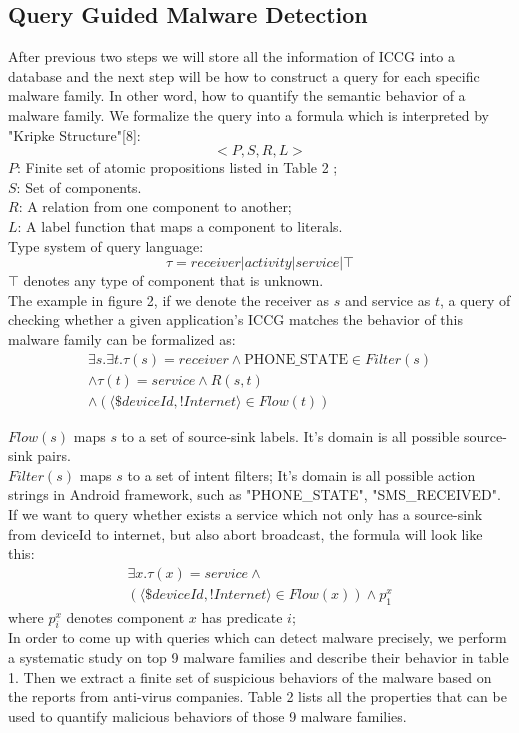 \documentclass{sig-alternate}
\begin{document}
\subsection{Query Guided Malware Detection}
After previous two steps we will store all the information of ICCG into a database and the next step will be how to construct a query for each specific malware family. In other word, how to quantify the semantic behavior of a malware family.
We formalize the query into a formula which is interpreted by "Kripke Structure"[8]:
\[
<P, S, R, L> 
\]
$P$: Finite set of atomic propositions listed in Table 2 ; \\
$S$: Set of components.\\
$R$: A relation from one component to another; \\
$L$: A label function that maps a component to literals. \\
Type system of query language:
\[
\tau = receiver | activity | service | \top
\]
$\top$ denotes any type of component that is unknown.\\
The example in figure 2, if we denote the receiver as $s$ and service as $t$, a query of checking whether a given application's ICCG matches the behavior of this malware family can be formalized as:
 \[
\begin{array}{cc}
\exists s. \exists t. \tau(s)=receiver \land \text{PHONE\_STATE} \in Filter(s) \\
\land \tau(t)=service \land R(s,t)  \\
\land (\langle \$deviceId, !Internet\rangle \in Flow(t) )
\end{array}
\]
 
$Flow(s)$ maps $s$ to a set of source-sink labels.  It's domain is  all possible source-sink pairs.\\
$Filter(s)$ maps $s$ to a set of intent filters;  It's domain is all possible action strings in Android framework, such as "PHONE\_STATE", "SMS\_RECEIVED".\\
If we want to query whether exists a service which not only has a source-sink from deviceId to internet, but also abort broadcast, the formula will look like this:
\[
\begin{array}{cc}
\exists x. \tau(x)=service \land \\
 (\langle \$deviceId, !Internet\rangle \in Flow(x) )\land p^{x}_{1}
\end{array}
\]
where $p^{x}_i$ denotes component $x$ has predicate $i$;\\
In order to come up with queries which can detect malware precisely, we perform a systematic study on top 9 malware families and describe their behavior in table 1. Then we extract a finite set of suspicious behaviors of the malware based on the reports from anti-virus companies.  Table 2 lists all the properties that can be used to quantify malicious behaviors of those 9 malware families. 
\end{document}
